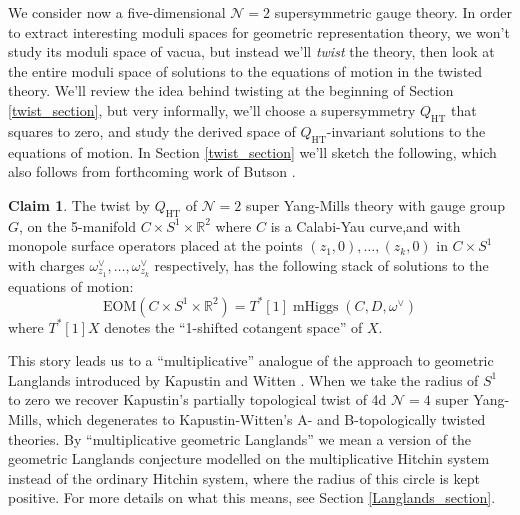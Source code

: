 \documentclass[11pt, oneside, reqno]{amsart}
\theoremstyle{definition} \newtheorem{definition}{Definition}[section]
\newtheorem{claimnum}[definition]{Claim}
\theoremstyle{definition} \newtheorem{remark}[definition]{Remark}
\theoremstyle{definition} \newtheorem{remarks}[definition]{Remarks}
\theoremstyle{definition} \newtheorem{question}[definition]{Question}
\theoremstyle{definition} \newtheorem*{note}{Note}
\theoremstyle{definition} \newtheorem{example}[definition]{Example}
\theoremstyle{definition} \newtheorem{examples}[definition]{Examples}
\newcommand{\mr}[1]{\mathrm{#1}}
\newcommand{\mc}[1]{\mathcal{#1}}
\newcommand{\RR}{\mathbb{R}}
\DeclareMathOperator{\mhiggs}{mHiggs}
\newcommand{\HT}{\mr{HT}}
\begin{document}
We consider now a five-dimensional $\mc N=2$ supersymmetric gauge theory.  In order to extract interesting moduli spaces for geometric representation theory, we won't study its moduli space of vacua, but instead we'll \emph{twist} the theory, then look at the entire moduli space of solutions to the equations of motion in the twisted theory.  We'll review the idea behind twisting at the beginning of Section \ref{twist_section}, but very informally, we'll choose a supersymmetry $Q_\HT$ that squares to zero, and study the derived space of $Q_\HT$-invariant solutions to the equations of motion.  In Section \ref{twist_section} we'll sketch the following, which also follows from forthcoming work of Butson \cite{Butson}.

\begin{claimnum}
The twist by $Q_\HT$ of $\mc N=2$ super Yang-Mills theory with gauge group $G$, on the 5-manifold $C \times S^1 \times \RR^2$ where $C$ is a Calabi-Yau curve,and  with monopole surface operators placed at the points $(z_1,0), \ldots, (z_k,0)$ in $C \times S^1$ with charges $\omega^\vee_{z_1}, \ldots, \omega^\vee_{z_k}$ respectively, has the following stack of solutions to the equations of motion:
\[\mr{EOM}(C \times S^1 \times \RR^2) = T^*[1]\mhiggs(C,D,\omega^\vee)\]
where $T^*[1]X$ denotes the ``1-shifted cotangent space'' of $X$.
\end{claimnum}

This story leads us to a ``multiplicative'' analogue of the approach to geometric Langlands introduced by Kapustin and Witten \cite{KapustinWitten}.  When we take the radius of $S^1$ to zero we recover Kapustin's partially topological twist \cite{KapustinHolo} of 4d $\mc N=4$ super Yang-Mills, which degenerates to Kapustin-Witten's A- and B-topologically twisted theories.  By ``multiplicative geometric Langlands'' we mean a version of the geometric Langlands conjecture modelled on the multiplicative Hitchin system instead of the ordinary Hitchin system, where the radius of this circle is kept positive.  For more details on what this means, see Section \ref{Langlands_section}.
\end{document}
